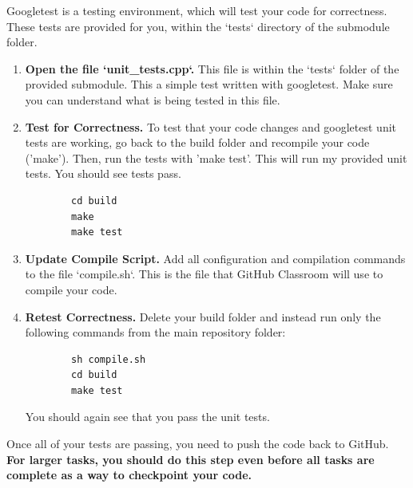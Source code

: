 \documentclass{article} %
\begin{document}

Googletest is a testing environment, which will test your code for correctness.  These tests are provided for you, within the `tests` directory of the submodule folder.

\begin{enumerate}
    \item \textbf{Open the file `unit\_tests.cpp`.}  This file is within the `tests` folder of the provided submodule.  This a simple test written with googletest.  Make sure you can understand what is being tested in this file.

    \item \textbf{Test for Correctness.}  To test that your code changes and googletest unit tests are working, go back to the build folder and recompile your code ('make').  Then, run the tests with 'make test'.  This will run my provided unit tests.  You should see tests pass.
    \begin{verbatim}
        cd build
        make
        make test
    \end{verbatim}
    

    \item \textbf{Update Compile Script.}  Add all configuration and compilation commands to the file `compile.sh`.  This is the file that GitHub Classroom will use to compile your code.

    \item \textbf{Retest Correctness.}  Delete your build folder and instead run only the following commands from the main repository folder:
    \begin{verbatim}
        sh compile.sh
        cd build
        make test
    \end{verbatim}
    You should again see that you pass the unit tests.
\end{enumerate}



Once all of your tests are passing, you need to push the code back to GitHub.  \textbf{For larger tasks, you should do this step even before all tasks are complete as a way to checkpoint your code.}
\end{document}
